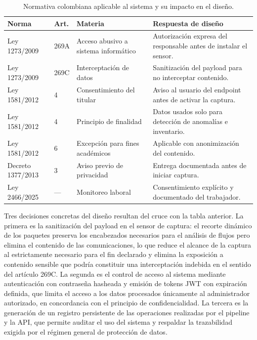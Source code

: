 \begin{table}[H]
\centering
\caption{Normativa colombiana aplicable al sistema y su impacto en el diseño.}
\label{tab:marco-legal}
\footnotesize
\begin{tabular}{@{}p{1.5cm}p{0.8cm}p{2.2cm}p{2.7cm}@{}}
\toprule
\textbf{Norma} & \textbf{Art.} & \textbf{Materia} & \textbf{Respuesta de diseño} \\
\midrule
Ley 1273/2009 & 269A & Acceso abusivo a sistema informático & Autorización expresa del responsable antes de instalar el sensor. \\[3pt]
Ley 1273/2009 & 269C & Interceptación de datos & Sanitización del payload para no interceptar contenido. \\[3pt]
Ley 1581/2012 & 4 & Consentimiento del titular & Aviso al usuario del endpoint antes de activar la captura. \\[3pt]
Ley 1581/2012 & 4 & Principio de finalidad & Datos usados solo para detección de anomalías e inventario. \\[3pt]
Ley 1581/2012 & 6 & Excepción para fines académicos & Aplicable con anonimización del contenido. \\[3pt]
Decreto 1377/2013 & 3 & Aviso previo de privacidad & Entrega documentada antes de iniciar captura. \\[3pt]
Ley 2466/2025 & --- & Monitoreo laboral & Consentimiento explícito y documentado del trabajador. \\
\bottomrule
\end{tabular}
\end{table}

Tres decisiones concretas del diseño resultan del cruce con la 
tabla anterior. La primera es la sanitización del payload en el 
sensor de captura: el recorte dinámico de los paquetes preserva los 
encabezados necesarios para el análisis de flujos pero elimina el 
contenido de las comunicaciones, lo que reduce el alcance de la 
captura al estrictamente necesario para el fin declarado y elimina la 
exposición a contenido sensible que podría constituir una 
interceptación indebida en el sentido del artículo 269C. La segunda 
es el control de acceso al sistema mediante autenticación con 
contraseña hasheada y emisión de tokens JWT con expiración definida, 
que limita el acceso a los datos procesados únicamente al 
administrador autorizado, en concordancia con el principio de 
confidencialidad. La tercera es la generación de un registro 
persistente de las operaciones realizadas por el pipeline y la API, 
que permite auditar el uso del sistema y respaldar la trazabilidad 
exigida por el régimen general de protección de datos.

